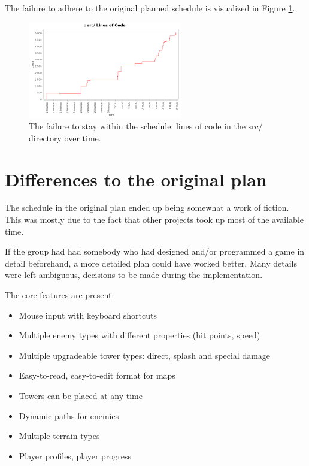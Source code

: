 \documentclass[11pt]{article}
\begin{document}
The failure to adhere to the original planned schedule is visualized
in Figure \ref{fig:failure}.

\begin{figure}
\centering
\includegraphics[width=0.6\textwidth]{loc.png}
\caption{The failure to stay within the schedule: lines of code in the src/ directory over time.}
\label{fig:failure}
\end{figure}


\section{Differences to the original plan}
\label{sec-6}

The schedule in the original plan ended up being somewhat a work of
fiction. This was mostly due to the fact that other projects took up
most of the available time.

If the group had had somebody who had designed and/or programmed a
game in detail beforehand, a more detailed plan could have worked
better. Many details were left ambiguous, decisions to be made during
the implementation.

The core features are present:

\begin{itemize}
\item Mouse input with keyboard shortcuts
\item Multiple enemy types with different properties (hit points, speed)
\item Multiple upgradeable tower types: direct, splash and special damage
\item Easy-to-read, easy-to-edit format for maps
\item Towers can be placed at any time
\item Dynamic paths for enemies
\item Multiple terrain types
\item Player profiles, player progress
\end{itemize}
\end{document}

